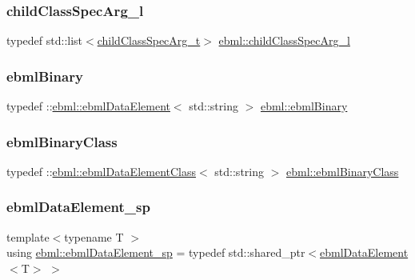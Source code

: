 \subsubsection{\texorpdfstring{child\+Class\+Spec\+Arg\+\_\+l}{childClassSpecArg\_l}}
{\footnotesize\ttfamily typedef std\+::list$<$\mbox{\hyperlink{structebml_1_1childClassSpecArg__t}{child\+Class\+Spec\+Arg\+\_\+t}}$>$ \mbox{\hyperlink{namespaceebml_abf07998998c284c9be3f76b5d9e192e1}{ebml\+::child\+Class\+Spec\+Arg\+\_\+l}}}

\mbox{\label{namespaceebml_a9b2775bff9ce97bc09b955ca1de557ae}} 
\subsubsection{\texorpdfstring{ebml\+Binary}{ebmlBinary}}
{\footnotesize\ttfamily typedef \+::\mbox{\hyperlink{classebml_1_1ebmlDataElement}{ebml\+::ebml\+Data\+Element}}$<$ std\+::string $>$ \mbox{\hyperlink{namespaceebml_a9b2775bff9ce97bc09b955ca1de557ae}{ebml\+::ebml\+Binary}}}

\mbox{\label{namespaceebml_a4fe139b904ac34f0e3036c9451b4b18b}} 
\subsubsection{\texorpdfstring{ebml\+Binary\+Class}{ebmlBinaryClass}}
{\footnotesize\ttfamily typedef \+::\mbox{\hyperlink{classebml_1_1ebmlDataElementClass}{ebml\+::ebml\+Data\+Element\+Class}}$<$ std\+::string $>$ \mbox{\hyperlink{namespaceebml_a4fe139b904ac34f0e3036c9451b4b18b}{ebml\+::ebml\+Binary\+Class}}}

\mbox{\label{namespaceebml_a738c4f024d5a5af45f80985d0456ca6f}} 
\subsubsection{\texorpdfstring{ebml\+Data\+Element\+\_\+sp}{ebmlDataElement\_sp}}
{\footnotesize\ttfamily template$<$typename T $>$ \\
using \mbox{\hyperlink{namespaceebml_a738c4f024d5a5af45f80985d0456ca6f}{ebml\+::ebml\+Data\+Element\+\_\+sp}} = typedef std\+::shared\+\_\+ptr$<$\mbox{\hyperlink{classebml_1_1ebmlDataElement}{ebml\+Data\+Element}}$<$T$>$ $>$}

